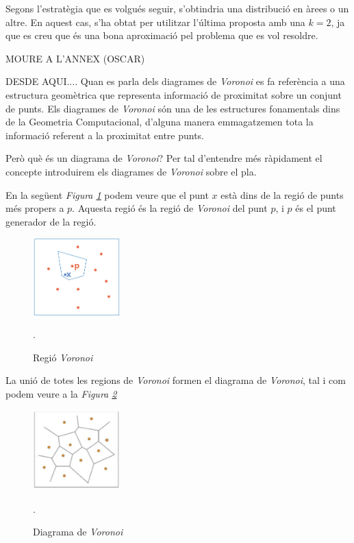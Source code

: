 \documentclass[12pt]{article}
\begin{document}
Segons l'estratègia que es volgués seguir, s'obtindria una distribució en àrees o un altre. En aquest cas, s'ha obtat per utilitzar l'última proposta amb una $k = 2$, ja que es creu que és una bona aproximació pel problema que es vol resoldre. 

MOURE A L'ANNEX (OSCAR)

DESDE AQUI....
Quan es parla dels diagrames de \textit{Voronoi} es fa referència a una estructura geomètrica que representa informació de proximitat sobre un conjunt de punts. Els diagrames de \textit{Voronoi} són una de les estructures fonamentals dins de la Geometria Computacional, d’alguna manera emmagatzemen tota la informació referent a la proximitat entre punts.

Però què és un diagrama de \textit{Voronoi}? Per tal d’entendre més ràpidament el concepte introduirem els diagrames de \textit{Voronoi} sobre el pla.

En la següent \textit{Figura \ref{fig:regio_voronoi}} podem veure que el punt $x$ està dins de la regió de punts més propers a $p$. Aquesta regió és la regió de \textit{Voronoi} del punt $p$, i $p$ és el punt generador de la regió.

\begin{figure}[H]
	\centering
	\includegraphics[width=0.3\textwidth]{imatges/regio_voronoi.png}\par\vspace{1cm}
	\caption{Regió \textit{Voronoi}}.
	\label{fig:regio_voronoi}
\end{figure}

La unió de totes les regions de \textit{Voronoi} formen el diagrama de \textit{Voronoi}, tal i com podem veure a la \textit{Figura \ref{fig:diagrama_voronoi}}

\begin{figure}[H]
	\centering
	\includegraphics[width=0.3\textwidth]{imatges/diagrama_voronoi.png}\par\vspace{1cm}
	\caption{Diagrama de \textit{Voronoi}}.
	\label{fig:diagrama_voronoi}
\end{figure}
\end{document}
